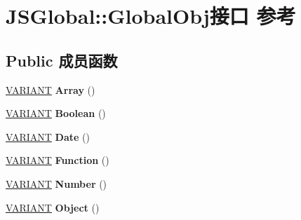 \hypertarget{interface_j_s_global_1_1_global_obj}{}\section{J\+S\+Global\+:\+:Global\+Obj接口 参考}
\label{interface_j_s_global_1_1_global_obj}
\subsection*{Public 成员函数}
\begin{DoxyCompactItemize}
\item 
\mbox{\label{interface_j_s_global_1_1_global_obj_a5fc07d063385f7c485dbc0510ef1a4a0}} 
\hyperlink{structtag_v_a_r_i_a_n_t}{V\+A\+R\+I\+A\+NT} {\bfseries Array} ()
\item 
\mbox{\label{interface_j_s_global_1_1_global_obj_a4d3cc5b4f799ed23e3bf6ae43f12c62f}} 
\hyperlink{structtag_v_a_r_i_a_n_t}{V\+A\+R\+I\+A\+NT} {\bfseries Boolean} ()
\item 
\mbox{\label{interface_j_s_global_1_1_global_obj_a66b03b08f1165d142c99dadeb2b88825}} 
\hyperlink{structtag_v_a_r_i_a_n_t}{V\+A\+R\+I\+A\+NT} {\bfseries Date} ()
\item 
\mbox{\label{interface_j_s_global_1_1_global_obj_a7d9ac9d9c5138d0f72254ccc88039b09}} 
\hyperlink{structtag_v_a_r_i_a_n_t}{V\+A\+R\+I\+A\+NT} {\bfseries Function} ()
\item 
\mbox{\label{interface_j_s_global_1_1_global_obj_a7f5da6700d32c17642dc63426e1ca363}} 
\hyperlink{structtag_v_a_r_i_a_n_t}{V\+A\+R\+I\+A\+NT} {\bfseries Number} ()
\item 
\mbox{\label{interface_j_s_global_1_1_global_obj_a029429fe3e9fdd87e5cb5797cda9316e}} 
\hyperlink{structtag_v_a_r_i_a_n_t}{V\+A\+R\+I\+A\+NT} {\bfseries Object} ()
\item 
\mbox{\label{interface_j_s_global_1_1_global_obj_a6e663d813f086b56614b9c080f294035}} 

\end{DoxyCompactItemize}
